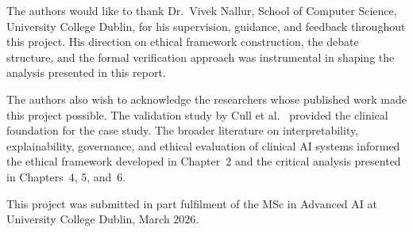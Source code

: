 \documentclass[]{UCD_CS_41820_Report}
\begin{document}
The authors would like to thank Dr.\ Vivek Nallur, School of Computer Science,
University College Dublin, for his supervision, guidance, and feedback throughout
this project. His direction on ethical framework construction, the debate structure,
and the formal verification approach was instrumental in shaping the analysis
presented in this report.

\medskip
The authors also wish to acknowledge the researchers whose published work made this
project possible. The validation study by Cull et al.\ \cite{cull2023} provided the
clinical foundation for the case study. The broader literature on interpretability,
explainability, governance, and ethical evaluation of clinical AI systems informed
the ethical framework developed in Chapter~2 and the critical analysis presented in
Chapters~4, 5, and~6.

\medskip
This project was submitted in part fulfilment of the MSc in Advanced AI at
University College Dublin, March 2026.

\printbibliography
\end{document}
